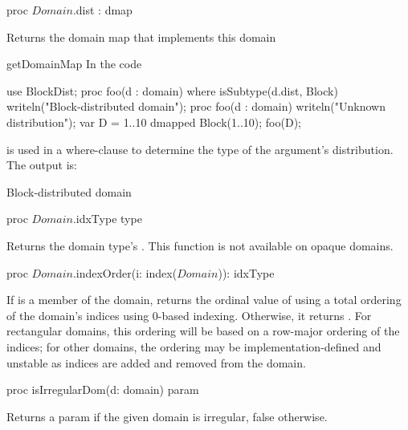 \begin{protohead}
proc $Domain$.dist : dmap
\end{protohead}
\begin{protobody}
Returns the domain map that implements this domain
\end{protobody}

\begin{chapelexample}{getDomainMap}
In the code
\begin{chapel}
use BlockDist;
proc foo(d : domain) where isSubtype(d.dist, Block) {
  writeln("Block-distributed domain");
}
proc foo(d : domain) {
  writeln("Unknown distribution");
}
var D = {1..10} dmapped Block({1..10});
foo(D);
\end{chapel}
 is used in a where-clause to determine the type of the argument's
distribution. The output is:
\begin{chapelprintoutput}{}
Block-distributed domain
\end{chapelprintoutput}
\end{chapelexample}

\begin{protohead}
proc $Domain$.idxType type
\end{protohead}
\begin{protobody}
Returns the domain type's .
This function is not available on opaque domains.
\end{protobody}

\begin{protohead}
proc $Domain$.indexOrder(i: index($Domain$)): idxType
\end{protohead}
\begin{protobody}
If  is a member of the domain, returns the ordinal value of
 using a total ordering of the domain's indices using 0-based
indexing.  Otherwise, it returns .  For rectangular
domains, this ordering will be based on a row-major ordering of the
indices; for other domains, the ordering may be
implementation-defined and unstable as indices are added and
removed from the domain.
\end{protobody}

\begin{protohead}
proc isIrregularDom(d: domain) param
\end{protohead}
\begin{protobody}
Returns a param  if the given domain is irregular, false otherwise.
\end{protobody}

